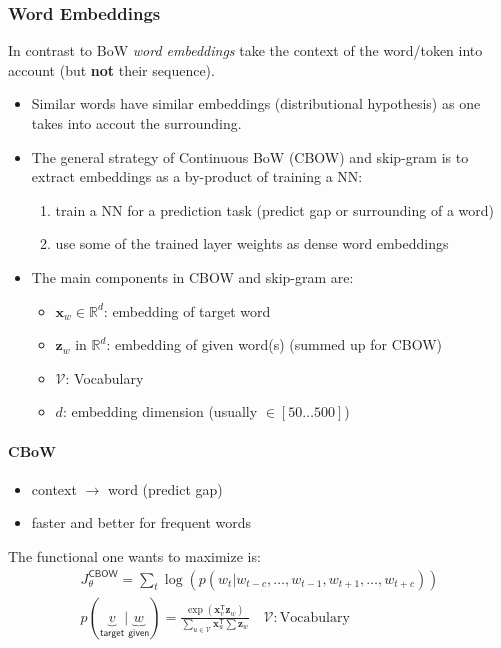 \subsubsection{Word Embeddings}
In contrast to BoW \textit{word embeddings} take the context of the word/token into account (but \textbf{not} their sequence).
\begin{itemize}
    \item Similar words have similar embeddings (distributional hypothesis) as one takes into accout the surrounding.
    \item The general strategy of Continuous BoW (CBOW) and skip-gram is to extract embeddings as a by-product of training a NN:
          \begin{enumerate}
              \item train a NN for a prediction task (predict gap or surrounding of a word)
              \item use some of the trained layer weights as dense word embeddings
          \end{enumerate}
    \item The main components in CBOW and skip-gram are:
          \begin{itemize}
              \item $\mathbf{x}_w \in \mathbb{R}^d$: embedding of target word
              \item $\mathbf{z} _w$ in $\mathbb{R}^d$: embedding of given word(s) (summed up for CBOW)
              \item $\mathcal{V}$: Vocabulary
              \item $d$: embedding dimension (usually $\in [50\dots500]$)
          \end{itemize}
\end{itemize}

\paragraph{CBoW}
\begin{itemize}
    \item context $\to$ word (predict gap)
    \item faster and better for frequent words
\end{itemize}

The functional one wants to maximize is:
\noindent\begin{gather*}
    J_\theta^{\mathsf{CBOW}}                                               = \sum_{t}\log\left(p(w_t|w_{t-c},\ldots, w_{t-1},w_{t+1},\ldots, w_{t+c})\right)                                   \\
    p(\underbrace{v}_{\textsf{target}} | \underbrace{w}_{\textsf{given}})  = \frac{\exp(\mathbf{x}_v^{\mathsf{T}}\mathbf{z}_w)}{\sum\limits_{u\in \mathcal{V}} \mathbf{x}_u^{\mathsf{T}}\sum\mathbf{z}_w} \quad \mathcal{V}: \text{Vocabulary}
\end{gather*}

